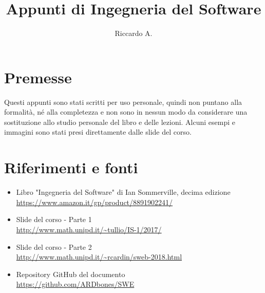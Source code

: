

\author{Riccardo A.}
\title{Appunti di Ingegneria del Software}



\maketitle

\section*{Premesse}
Questi appunti sono stati scritti per uso personale, quindi non puntano alla formalità, né alla completezza e non sono in nessun modo da considerare una sostituzione allo studio personale del libro e delle lezioni. 
Alcuni esempi e immagini sono stati presi direttamente dalle slide del corso.

\section*{Riferimenti e fonti}
\begin{itemize}
\item Libro "Ingegneria del Software" di Ian Sommerville, decima edizione\\
\url{https://www.amazon.it/gp/product/8891902241/}
\item Slide del corso - Parte 1 \\
\url{http://www.math.unipd.it/~tullio/IS-1/2017/}
\item Slide del corso - Parte 2 \\
\url{http://www.math.unipd.it/~rcardin/sweb-2018.html}
\item Repository GitHub del documento \\
\url{https://github.com/ARDbones/SWE}
\end{itemize}

\tableofcontents
\newpage



